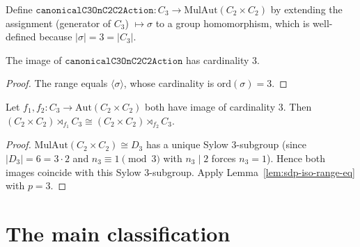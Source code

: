 \begin{definition}
    \label{def:canonicalC3OnC2C2}
    Define $\mathtt{canonicalC3OnC2C2Action} : C_3 \to
    \mathrm{MulAut}(C_2 \times C_2)$ by extending the assignment
    (generator of $C_3$) $\mapsto \sigma$ to a group homomorphism, which is
    well-defined because $|\sigma| = 3 = |C_3|$.
\end{definition}

\begin{lemma}
    \label{lem:canonicalC3OnC2C2-range}
    The image of $\mathtt{canonicalC3OnC2C2Action}$ has cardinality $3$.
\end{lemma}
\begin{proof}
    The range equals $\langle \sigma \rangle$, whose cardinality is
    $\mathrm{ord}(\sigma) = 3$.
\end{proof}

\begin{lemma}
    \label{lem:sdp-C3-on-C2C2-iso}
    Let $f_1, f_2 : C_3 \to \mathrm{Aut}(C_2 \times C_2)$ both have image of
    cardinality $3$. Then $(C_2 \times C_2) \rtimes_{f_1} C_3 \cong
    (C_2 \times C_2) \rtimes_{f_2} C_3$.
\end{lemma}
\begin{proof}
    $\mathrm{MulAut}(C_2 \times C_2) \cong D_3$ has a unique Sylow
    $3$-subgroup (since $|D_3| = 6 = 3 \cdot 2$ and $n_3 \equiv 1
    \pmod 3$ with $n_3 \mid 2$ forces $n_3 = 1$). Hence both images coincide
    with this Sylow $3$-subgroup. Apply
    Lemma~\ref{lem:sdp-iso-range-eq} with $p = 3$.
\end{proof}

\section{The main classification}

